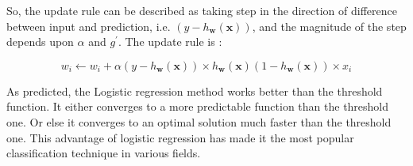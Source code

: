 \documentclass{article}
\begin{document}
    So, the update rule can be described as taking step in the direction of difference between input and prediction, i.e. $(y-h_{\mathbf{w}}(\mathbf{x}))$, and the magnitude of the step depends upon $\alpha$ and $g^{\prime}$. The update rule is :

    \begin{equation*}
      w_i \leftarrow w_i + \alpha (y - h_{\mathbf{w}}(\mathbf{x})) \times h_{\mathbf{w}}(\mathbf{x})(1 - h_{\mathbf{w}}(\mathbf{x})) \times x_i
    \end{equation*}

    As predicted, the Logistic regression method works better than the threshold function. It either converges to a more predictable function than the threshold one. Or else it converges to an optimal solution much faster than the threshold one. This advantage of logistic regression has made it the most popular classification technique in various fields. 

    
\end{document}
